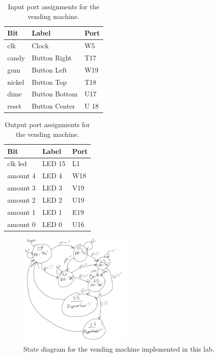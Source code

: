 \documentclass[11pt]{article}
\begin{document}
\begin{table}[H]
\begin{center}
\begin{tabular}{| l | l | l |}
	\hline
	Bit & Label & Port \\ \hline
	clk & Clock & W5 \\ \hline
	candy & Button Right & T17 \\ \hline
	gum & Button Left & W19 \\ \hline
	nickel & Button Top & T18 \\ \hline
	dime & Button Bottom & U17 \\ \hline
	reset & Button Center & U 18 \\ \hline
\end{tabular}
\caption{\label{tab:lab10_input_Ports}Input port assignments for  the vending machine.}
\end{center}
\end{table}

\begin{table}[H]
\begin{center}
\begin{tabular}{| l | l | l |}
	\hline
	Bit & Label & Port \\ \hline
	clk led & LED 15 & L1 \\ \hline
	amount 4 & LED 4 & W18 \\ \hline
	amount 3 & LED 3 & V19 \\ \hline
	amount 2 & LED 2 & U19 \\ \hline
	amount 1 & LED 1 & E19 \\ \hline
	amount 0 & LED 0 & U16 \\ \hline
\end{tabular}
\caption{\label{tab:lab10_output_Ports}Output port assignments for the vending machine.}
\end{center}
\end{table}

\begin{figure}
\begin{center}
	\includegraphics[width=0.5\textwidth]{./images/vendingMachineStateDiagram.png}
	\caption{\label{fig:lab10_state_diagram}State diagram for the vending machine implemented in this lab.}
\end{center}
\end{figure}
\end{document}
